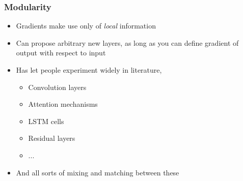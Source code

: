 \documentclass[10pt,mathserif]{beamer}
\begin{document}
\begin{frame}
  \frametitle{Modularity}
  \begin{itemize}
  \item Gradients make use only of \textit{local} information
  \item Can propose arbitrary new layers, as long as you can define gradient of
    output with respect to input
  \item Has let people experiment widely in literature,
    \begin{itemize}
    \item Convolution layers \citep{lecun1995convolutional}
    \item Attention mechanisms \citep{olah2016attention}
    \item LSTM cells \citep{schmidhuber1997long}
    \item Residual layers \citep{he2016deep}
    \item ...
    \end{itemize}
  \item And all sorts of mixing and matching between these
  \end{itemize}
\end{frame}




\end{document}
